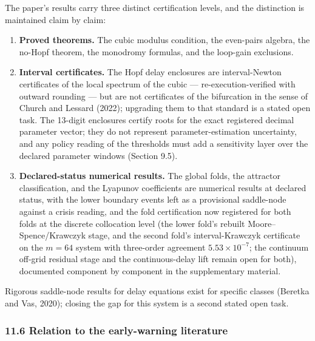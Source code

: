 \documentclass[11pt]{article}
\providecommand{\tightlist}{\setlength{\itemsep}{0pt}\setlength{\parskip}{0pt}}
\begin{document}
The paper's results carry three distinct certification levels, and the
distinction is maintained claim by claim:

\begin{enumerate}
\def\labelenumi{\arabic{enumi}.}
\tightlist
\item
  \textbf{Proved theorems.} The cubic modulus condition, the even-pairs
  algebra, the no-Hopf theorem, the monodromy formulas, and the
  loop-gain exclusions.
\item
  \textbf{Interval certificates.} The Hopf delay enclosures are
  interval-Newton certificates of the local spectrum of the cubic ---
  re-execution-verified with outward rounding --- but are not
  certificates of the bifurcation in the sense of Church and Lessard
  (2022); upgrading them to that standard is a stated open task. The
  13-digit enclosures certify roots for the exact registered decimal
  parameter vector; they do not represent parameter-estimation
  uncertainty, and any policy reading of the thresholds must add a
  sensitivity layer over the declared parameter windows (Section 9.5).
\item
  \textbf{Declared-status numerical results.} The global folds, the
  attractor classification, and the Lyapunov coefficients are numerical
  results at declared status, with the lower boundary events left as a
  provisional saddle-node against a crisis reading, and the fold
  certification now registered for both folds at the discrete
  collocation level (the lower fold's rebuilt Moore--Spence/Krawczyk
  stage, and the second fold's interval-Krawczyk certificate on the
  \(m = 64\) system with three-order agreement \(5.53\times10^{-7}\);
  the continuum off-grid residual stage and the continuous-delay lift
  remain open for both), documented component by component in the
  supplementary material.
\end{enumerate}

Rigorous saddle-node results for delay equations exist for specific
classes (Beretka and Vas, 2020); closing the gap for this system is a
second stated open task.

\subsubsection{11.6 Relation to the early-warning
literature}\label{relation-to-the-early-warning-literature}
\end{document}
